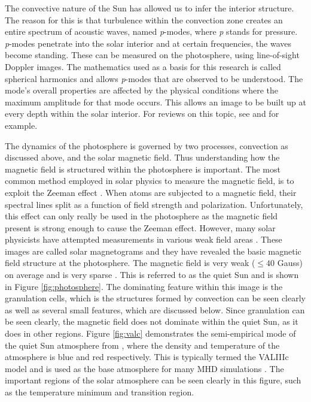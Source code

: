     The convective nature of the Sun has allowed us to infer the interior structure. 
    The reason for this is that turbulence within the convection zone creates an entire spectrum of acoustic waves, named \textit{p}-modes, where \textit{p} stands for pressure.
    \textit{p}-modes penetrate into the solar interior and at certain frequencies, the waves become standing.
    These can be measured on the photosphere, using line-of-sight Doppler images. 
    The mathematics used as a basis for this research is called spherical harmonics and allows \textit{p}-modes that are observed to be understood.
    The mode's overall properties are affected by the physical conditions where the maximum amplitude for that mode occurs. 
    This allows an image to be built up at every depth within the solar interior.
    For reviews on this topic, see \cite{annurev.aa.22.090184.003113} and \cite{RevModPhys.74.1073} for example.
    
    The dynamics of the photosphere is governed by two processes, convection as discussed above, and the solar magnetic field.
    Thus understanding how the magnetic field is structured within the photosphere is important. 
    The most common method employed in solar physics to measure the magnetic field, is to exploit the Zeeman effect \citep{phillips1995guide}.
    When atoms are subjected to a magnetic field, their spectral lines split as a function of field strength and polarization.
    Unfortunately, this effect can only really be used in the photosphere as the magnetic field present is strong enough to cause the Zeeman effect.
    However, many solar physicists have attempted measurements in various weak field areas \citep{1995ApJ...439..474M,1538-4357-613-2-L177,2008A&A...489L..57K}.
    These images are called solar magnetograms and they have revealed the basic magnetic field structure at the photosphere.
    The magnetic field is very weak ($\le 40$ Gauss) on average and is very sparse \citep{0004-637X-636-1-496,2011A&A...526A..60V}.
    This is referred to as the quiet Sun and is shown in Figure \ref{fig:photosphere}. 
    The dominating feature within this image is the granulation cells, which is the structures formed by convection can be seen clearly as well as several small features, which are discussed below. 
    Since granulation can be seen clearly, the magnetic field does not dominate within the quiet Sun, as it does in other regions.
    Figure \ref{fig:valc} demonstrates the semi-empirical mode of the quiet Sun atmosphere from \cite{1981ApJS...45..635V}, where the density and temperature of the atmosphere is blue and red respectively.
    This is typically termed the VALIIIc model and is used as the base atmosphere for many MHD simulations \citep{Mumford2015,GFME13a,fedun1,fedun2,2011AnGeo..29..883S,Wedemeyer2012,Vigeesh2012,0004-637X-743-1-14}.
    The important regions of the solar atmosphere can be seen clearly in this figure, such as the temperature minimum and transition region.
    
